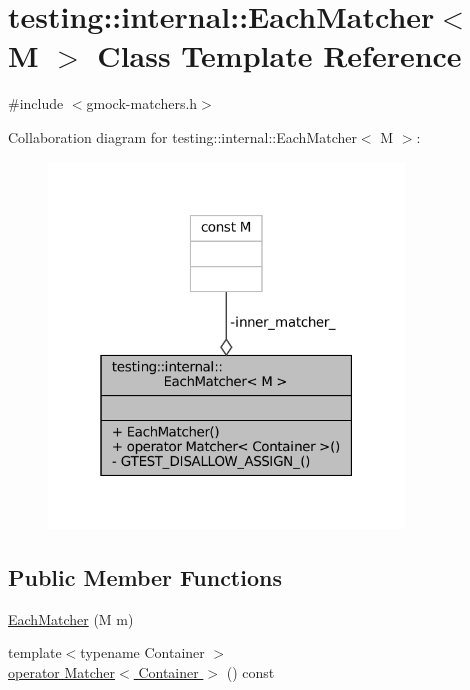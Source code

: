\hypertarget{classtesting_1_1internal_1_1EachMatcher}{}\section{testing\+:\+:internal\+:\+:Each\+Matcher$<$ M $>$ Class Template Reference}
\label{classtesting_1_1internal_1_1EachMatcher}


{\ttfamily \#include $<$gmock-\/matchers.\+h$>$}



Collaboration diagram for testing\+:\+:internal\+:\+:Each\+Matcher$<$ M $>$\+:
\nopagebreak
\begin{figure}[H]
\begin{center}
\leavevmode
\includegraphics[width=268pt]{classtesting_1_1internal_1_1EachMatcher__coll__graph}
\end{center}
\end{figure}
\subsection*{Public Member Functions}
\begin{DoxyCompactItemize}
\item 
\hyperlink{classtesting_1_1internal_1_1EachMatcher_a597f567d454f85733c66f7527f9aadb7}{Each\+Matcher} (M m)
\item 
{\footnotesize template$<$typename Container $>$ }\\\hyperlink{classtesting_1_1internal_1_1EachMatcher_a81bd8bb67346dd2c07c7bf85a1b2d062}{operator Matcher$<$ Container $>$} () const
\end{DoxyCompactItemize}
